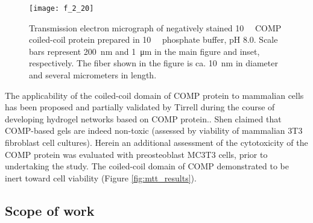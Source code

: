 \begin{refsection}
\begin{figure}[h!] \centering \texttt{[image: f\_2\_20]}
    \caption[Transmission electron micrograph of negatively stained
    \SI{10}{\micro\moLar} COMP coiled-coil protein prepared in
\SI{10}{\milli\moLar} phosphate buffer, pH 8.0. Scale bars represent
\SI{200}{\nm} and \SI{1}{\um} in the main figure and inset, respectively. The
fiber shown in the figure is ca. \SI{10}{\nm} in diameter and several
micrometers in length.]{Transmission electron micrograph of negatively stained
    \SI{10}{\micro\moLar} COMP coiled-coil protein prepared in
\SI{10}{\milli\moLar} phosphate buffer, pH 8.0. Scale bars represent
\SI{200}{\nm} and \SI{1}{\um} in the main figure and inset, respectively. The
fiber shown in the figure is ca. \SI{10}{\nm} in diameter and several
micrometers in length.\cite{Gunasekar2012}}\label{fig:COMP_EM_2} \end{figure}

The applicability of the coiled-coil domain of COMP protein to mammalian cells
has been proposed and partially validated by Tirrell  during the
course of developing hydrogel networks based on COMP protein.\cite{Shen2006a}.
Shen  claimed that COMP-based gels are indeed non-toxic
(assessed by viability of mammalian 3T3 fibroblast cell cultures). Herein an
additional assessment of the cytotoxicity of the COMP protein was evaluated with
preosteoblast MC3T3 cells, prior to undertaking the study. The coiled-coil
domain of COMP demonstrated to be inert toward cell viability (Figure
\ref{fig:mtt_results}).

\subsection{Scope of work}



\end{refsection}
